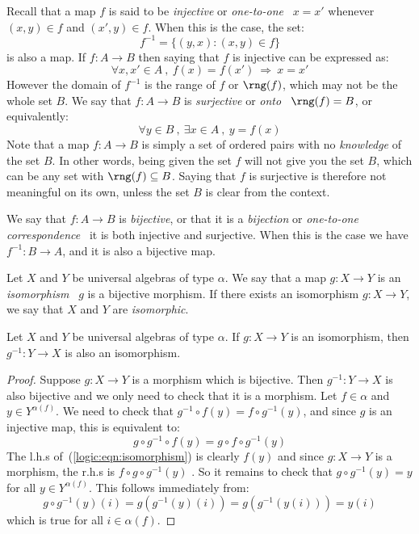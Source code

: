 Recall that a map $f$ is said to be {\em injective} or {\em
one-to-one} \ifand\ $x=x'$ whenever $(x,y)\in f$ and $(x',y)\in f$.
When this is the case, the set:
    \[
    f^{-1}=\{(y,x): (x,y)\in f\}
    \]
is also a map. If $f:A\to B$ then saying that $f$ is injective can be expressed as:
    \[
    \forall x,x'\in A\ ,\ f(x)=f(x')\ \Rightarrow\ x=x'
    \]
However the domain of $f^{-1}$ is the range of $f$ or $\rng(f)$,
which may not be the whole set $B$. We say that $f:A\to B$ is {\em
surjective} or {\em onto} \ifand\ $\rng(f)=B$, or equivalently:
    \[
    \forall y\in B\ ,\ \exists x\in A\ ,\ y=f(x)
    \]
Note that a map $f:A\to B$ is simply a set of ordered pairs with no
{\em knowledge} of the set $B$. In other words, being given the set
$f$ will not give you the set $B$, which can be any set with
$\rng(f)\subseteq B$. Saying that $f$ is surjective is therefore not
meaningful on its own, unless the set $B$ is clear from the context.

We say that $f:A\to B$ is {\em bijective}, or that it is a {\em
bijection} or {\em one-to-one correspondence} \ifand\ it is both
injective and surjective. When this is the case we have $f^{-1}:B\to
A$, and it is also a bijective map.
\begin{defin}\label{logic:def:isomorphism}
Let $X$ and $Y$ be universal algebras of type $\alpha$. We say that
a map $g:X\to Y$ is an {\em isomorphism} \ifand\ $g$ is a bijective
morphism. If there exists an isomorphism $g:X\to Y$, we say that $X$
and $Y$ are {\em isomorphic}.
\end{defin}
\begin{prop}
Let $X$ and $Y$ be universal algebras of type $\alpha$. If $g:X\to
Y$ is an isomorphism, then $g^{-1}:Y\to X$ is also an isomorphism.
\end{prop}
\begin{proof}
Suppose $g:X\to Y$ is a morphism which is bijective. Then
$g^{-1}:Y\to X$ is also bijective and we only need to check that it
is a morphism. Let $f\in\alpha$ and $y\in Y^{\alpha(f)}$. We need to
check that $g^{-1}\circ f(y) = f\circ g^{-1}(y)$, and since $g$ is
an injective map, this is equivalent to:
    \begin{equation}\label{logic:eqn:isomorphism}
    g\circ g^{-1}\circ f(y) =g\circ f\circ g^{-1}(y)
    \end{equation}
The l.h.s of~(\ref{logic:eqn:isomorphism}) is clearly $f(y)$ and
since $g:X\to Y$ is a morphism, the r.h.s is $f\circ g\circ
g^{-1}(y)$ . So it remains to check that $g\circ g^{-1}(y)=y$ for
all $y\in Y^{\alpha(f)}$. This follows immediately from:
    \[
    g\circ g^{-1}(y)(i) = g(g^{-1}(y)(i))=g(g^{-1}(y(i)))=y(i)
    \]
which is true for all $i\in\alpha(f)$.
\end{proof}
